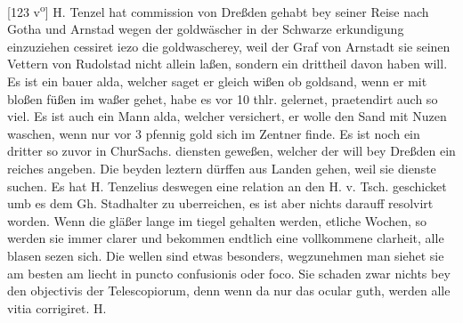 [123 v\textsuperscript{o}] H. Tenzel\protect{} hat commission von Dreßden\protect{}  gehabt bey seiner Reise nach Gotha\protect{} und Arnstad\protect{} wegen der goldw\"{a}scher in der Schwarze\protect{} erkundigung einzuziehen cessiret iezo die goldwascherey, weil der Graf von Arnstadt\protect{} sie seinen Vettern 
 von Rudolstad\protect{}\protect{} \protect{} \protect{} nicht allein laßen, sondern ein drittheil davon haben will. Es ist ein bauer alda, welcher saget er  gleich wißen ob goldsand, wenn er mit bloßen f\"{u}ßen im waßer gehet, habe es vor 10 thlr. gelernet, praetendirt auch so viel. Es ist auch ein Mann alda, welcher versichert, er wolle den Sand mit Nuzen waschen, wenn nur vor 3 pfennig gold sich im Zentner finde. Es ist noch ein dritter so zuvor in ChurSachs. diensten geweßen, welcher der will bey Dreßden\protect{} ein reiches  angeben. Die beyden leztern d\"{u}rffen aus Landen gehen, weil sie dienste suchen. Es hat H. Tenzelius\protect{} deswegen eine relation an den H. v. Tsch.\protect{} geschicket umb es dem Gh. Stadhalter zu uberreichen, es ist aber nichts darauff resolvirt worden.\pend \pstart {} Wenn die gl\"{a}ßer lange im tiegel  gehalten werden, etliche Wochen, so werden sie immer clarer und bekommen endtlich eine  vollkommene clarheit, alle blasen sezen sich. Die wellen sind etwas besonders,  wegzunehmen  man siehet sie am besten am liecht in puncto confusionis oder foco\protect{}. Sie schaden zwar nichts bey den objectivis\protect{} der Telescopiorum\protect{}, denn wenn da nur das ocular\protect{} guth, werden alle vitia corrigiret. H. 